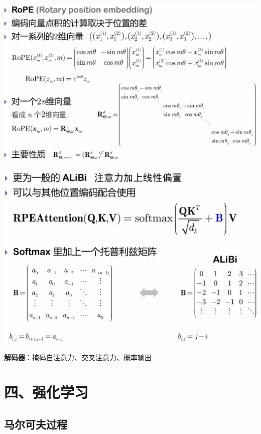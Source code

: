 	\begin{figurehere}
		\centering
		\includegraphics[width=1\linewidth]{image09}
		\label{fig:image09}
	\end{figurehere}
	\begin{figurehere}
		\centering
		\includegraphics[width=1\linewidth]{image10}
		\label{fig:image10}
	\end{figurehere}
	
	
	\textbf{解码器}：掩码自注意力、交叉注意力、概率输出
	
	\section*{四、强化学习}
	
	\subsection*{马尔可夫过程}
	
